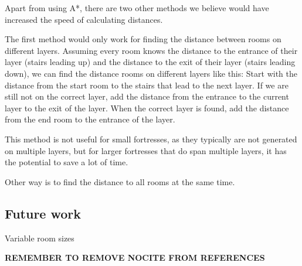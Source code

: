Apart from using A*, there are two other methods we believe would have increased the speed of calculating distances.

The first method would only work for finding the distance between rooms on different layers. Assuming every room knows the distance to the entrance of their layer (stairs leading up) and the distance to the exit of their layer (stairs leading down), we can find the distance rooms on different layers like this: Start with the distance from the start room to the stairs that lead to the next layer. If we are still not on the correct layer, add the distance from the entrance to the current layer to the exit of the layer. When the correct layer is found, add the distance from the end room to the entrance of the layer.

This method is not useful for small fortresses, as they typically are not generated on multiple layers, but for larger fortresses that do span multiple layers, it has the potential to save a lot of time.

Other way is to find the distance to all rooms at the same time.



\subsection{Future work}

Variable room sizes

\textbf{REMEMBER TO REMOVE NOCITE FROM REFERENCES}